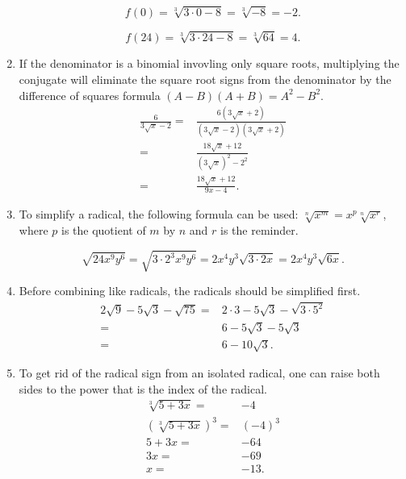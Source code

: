 \documentclass[
  12pt]{article}
\begin{document}
\begin{enumerate}
  \[f(0)=\sqrt[3]{3\cdot 0-8}=\sqrt[3]{-8}=-2.\]

  \[f(24)=\sqrt[3]{3\cdot 24-8}=\sqrt[3]{64}=4.\]
\item
  If the denominator is a binomial invovling only square roots,
  multiplying the conjugate will eliminate the square root signs from
  the denominator by the difference of squares formula
  \((A-B)(A+B)=A^2-B^2\). \[
  \begin{aligned}
  \frac{6}{3\sqrt{x}-2}=&\frac{6(3\sqrt{x}+2)}{(3\sqrt{x}-2)(3\sqrt{x}+2)}\\
  =&\frac{18\sqrt{x}+12}{(3\sqrt{x})^2-2^2}\\
  =&\frac{18\sqrt{x}+12}{9x-4}.
  \end{aligned}
  \]
\item
  To simplify a radical, the following formula can be used:
  \(\sqrt[n]{x^m}=x^p\sqrt[n]{x^r}\), where \(p\) is the quotient of
  \(m\) by \(n\) and \(r\) is the reminder.

  \[\sqrt{24x^9y^6}=\sqrt{3\cdot 2^3x^9y^6}=2x^4y^3\sqrt{3\cdot 2 x}=2x^4y^3\sqrt{6x}.\]
\item
  Before combining like radicals, the radicals should be simplified
  first. \[
  \begin{aligned}
  2\sqrt{9}-5\sqrt3-\sqrt{75}=&2\cdot 3-5\sqrt3-\sqrt{3\cdot 5^2}\\
  =&6-5\sqrt3-5\sqrt3\\
  =&6-10\sqrt3.
  \end{aligned}
  \]
\item
  To get rid of the radical sign from an isolated radical, one can raise
  both sides to the power that is the index of the radical. \[
  \begin{aligned}
  \sqrt[3]{5+3x}=&-4\\
  (\sqrt[3]{5+3x})^3=&(-4)^3\\
  5+3x=&-64\\
  3x=&-69\\
  x=&-13.
  \end{aligned}
  \]


\end{enumerate}
\end{document}
